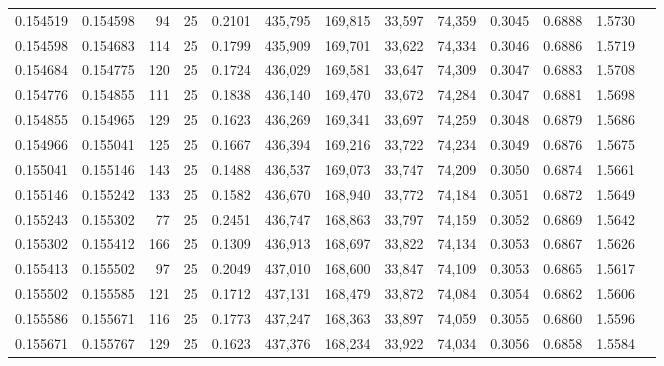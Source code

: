 \begin{tabular}{rrrrrrrrrrrrr}
0.154519 & 0.154598 &    94 &  25 &                                     0.2101 & 435,795 & 169,815 &  33,597 &  74,359 & 0.3045 & 0.6888 & 1.5730 \\
0.154598 & 0.154683 &   114 &  25 &                                     0.1799 & 435,909 & 169,701 &  33,622 &  74,334 & 0.3046 & 0.6886 & 1.5719 \\
0.154684 & 0.154775 &   120 &  25 &                                     0.1724 & 436,029 & 169,581 &  33,647 &  74,309 & 0.3047 & 0.6883 & 1.5708 \\
0.154776 & 0.154855 &   111 &  25 &                                     0.1838 & 436,140 & 169,470 &  33,672 &  74,284 & 0.3047 & 0.6881 & 1.5698 \\
0.154855 & 0.154965 &   129 &  25 &                                     0.1623 & 436,269 & 169,341 &  33,697 &  74,259 & 0.3048 & 0.6879 & 1.5686 \\
0.154966 & 0.155041 &   125 &  25 &                                     0.1667 & 436,394 & 169,216 &  33,722 &  74,234 & 0.3049 & 0.6876 & 1.5675 \\
0.155041 & 0.155146 &   143 &  25 &                                     0.1488 & 436,537 & 169,073 &  33,747 &  74,209 & 0.3050 & 0.6874 & 1.5661 \\
0.155146 & 0.155242 &   133 &  25 &                                     0.1582 & 436,670 & 168,940 &  33,772 &  74,184 & 0.3051 & 0.6872 & 1.5649 \\
0.155243 & 0.155302 &    77 &  25 &                                     0.2451 & 436,747 & 168,863 &  33,797 &  74,159 & 0.3052 & 0.6869 & 1.5642 \\
0.155302 & 0.155412 &   166 &  25 &                                     0.1309 & 436,913 & 168,697 &  33,822 &  74,134 & 0.3053 & 0.6867 & 1.5626 \\
0.155413 & 0.155502 &    97 &  25 &                                     0.2049 & 437,010 & 168,600 &  33,847 &  74,109 & 0.3053 & 0.6865 & 1.5617 \\
0.155502 & 0.155585 &   121 &  25 &                                     0.1712 & 437,131 & 168,479 &  33,872 &  74,084 & 0.3054 & 0.6862 & 1.5606 \\
0.155586 & 0.155671 &   116 &  25 &                                     0.1773 & 437,247 & 168,363 &  33,897 &  74,059 & 0.3055 & 0.6860 & 1.5596 \\
0.155671 & 0.155767 &   129 &  25 &                                     0.1623 & 437,376 & 168,234 &  33,922 &  74,034 & 0.3056 & 0.6858 & 1.5584 \\

\end{tabular}
